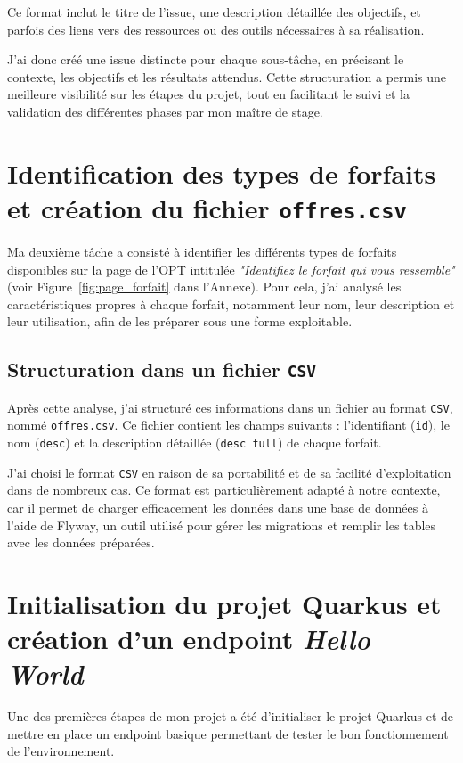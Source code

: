 \documentclass{article}
\begin{document}
	Ce format inclut le titre de l’issue, une description détaillée des objectifs, et parfois des liens vers des ressources ou des outils nécessaires à sa réalisation.
	
	J’ai donc créé une issue distincte pour chaque sous-tâche, en précisant le contexte, les objectifs et les résultats attendus. Cette structuration a permis une meilleure visibilité sur les étapes du projet, tout en facilitant le suivi et la validation des différentes phases par mon maître de stage.
	\section{Identification des types de forfaits et création du fichier \texttt{offres.csv}}
	
	Ma deuxième tâche a consisté à identifier les différents types de forfaits disponibles sur la page de l’OPT intitulée \textit{"Identifiez le forfait qui vous ressemble"} (voir Figure~\ref{fig:page_forfait} dans l'Annexe). Pour cela, j’ai analysé les caractéristiques propres à chaque forfait, notamment leur nom, leur description et leur utilisation, afin de les préparer sous une forme exploitable.
	
	\subsection*{Structuration dans un fichier \texttt{CSV}}
	Après cette analyse, j’ai structuré ces informations dans un fichier au format \texttt{CSV}, nommé \texttt{offres.csv}. Ce fichier contient les champs suivants : l’identifiant (\texttt{id}), le nom (\texttt{desc}) et la description détaillée (\texttt{desc full}) de chaque forfait.
	
	J’ai choisi le format \texttt{CSV} en raison de sa portabilité et de sa facilité d’exploitation dans de nombreux cas. Ce format est particulièrement adapté à notre contexte, car il permet de charger efficacement les données dans une base de données à l’aide de Flyway, un outil utilisé pour gérer les migrations et remplir les tables avec les données préparées.
	
	\section{Initialisation du projet Quarkus et création d’un endpoint \textit{Hello World}}
	
	Une des premières étapes de mon projet a été d’initialiser le projet Quarkus et de mettre en place un endpoint basique permettant de tester le bon fonctionnement de l’environnement.
	
\end{document}
